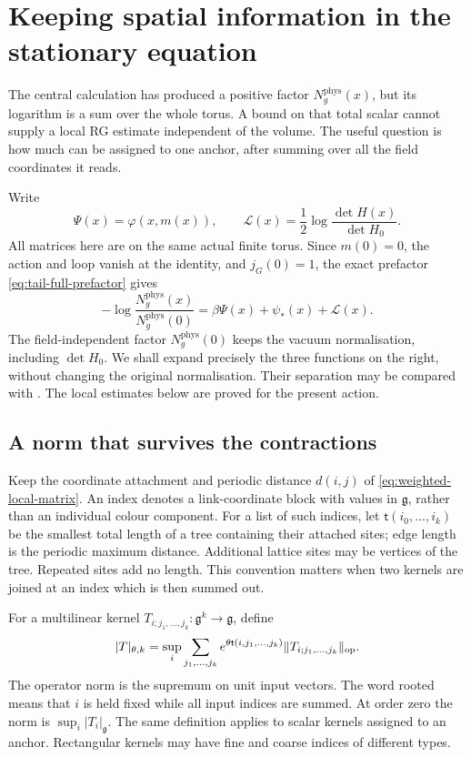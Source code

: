 \documentclass[11pt,reqno]{amsart}
\numberwithin{equation}{section}
\theoremstyle{definition}
\theoremstyle{remark}
\newcommand{\g}{\mathfrak g}
\begin{document}
\section{Keeping spatial information in the stationary equation}
\label{sec:rooted-stationary}

The central calculation has produced a positive factor
\(N_g^{\mathrm{phys}}(x)\), but its logarithm is a sum over the whole
torus. A bound on that total scalar cannot supply a local
RG estimate independent of the volume.
The useful question is how much can be assigned to one
anchor, after summing over all the field coordinates it reads.

Write
\[
        \Psi(x)=\varphi(x,m(x)),\qquad
        \mathcal L(x)=\frac12
                      \log\frac{\det H(x)}{\det H_0}.
\]
All matrices here are on the same actual finite torus.
Since \(m(0)=0\), the action and loop vanish at the
identity, and \(j_G(0)=1\), the exact prefactor
\eqref{eq:tail-full-prefactor} gives
\begin{equation}
       -\log\frac{N_g^{\mathrm{phys}}(x)}{N_g^{\mathrm{phys}}(0)}
                =\beta\Psi(x)+\psi_*(x)+\mathcal L(x).
 \label{eq:local-prefactor-target}
\end{equation}
The field-independent factor \(N_g^{\mathrm{phys}}(0)\) keeps the
vacuum normalisation, including \(\det H_0\).
We shall expand precisely the three functions on the
right, without changing the original normalisation.
Their separation may be compared with
\cite[Sect.~1, (1.3)--(1.7), printed pp.~260--261]{Bal87}.
The local estimates below are proved for the present action.

\subsection{A norm that survives the contractions}

Keep the coordinate attachment and periodic distance
\(d(i,j)\) of \eqref{eq:weighted-local-matrix}.
An index denotes a link-coordinate block with values
in \(\g\), rather than an individual colour component.
For a list of such indices, let
\(\mathsf t(i_0,\ldots,i_k)\) be the smallest total
length of a tree containing their attached sites;
edge length is the periodic maximum distance.
Additional lattice sites may be vertices of the tree.
Repeated sites add no length.
This convention matters when two kernels are joined at
an index which is then summed out.

For a multilinear kernel
\(T_{i;j_1,\ldots,j_k}:\g^k\to\g\), define
\begin{equation}
 |T|_{\theta,k}
    =\sup_i\sum_{j_1,\ldots,j_k}
        e^{\theta\mathsf t(i,j_1,\ldots,j_k)}
                       \|T_{i;j_1,\ldots,j_k}\|_{\rm op}.
 \label{eq:local-rooted-tensor}
\end{equation}
The operator norm is the supremum on unit input vectors.
The word rooted means that \(i\) is held fixed while
all input indices are summed. At order zero the norm
is \(\sup_i|T_i|_{\g}\).
The same definition applies to scalar kernels assigned
to an anchor. Rectangular kernels may have fine and
coarse indices of different types.
\end{document}
